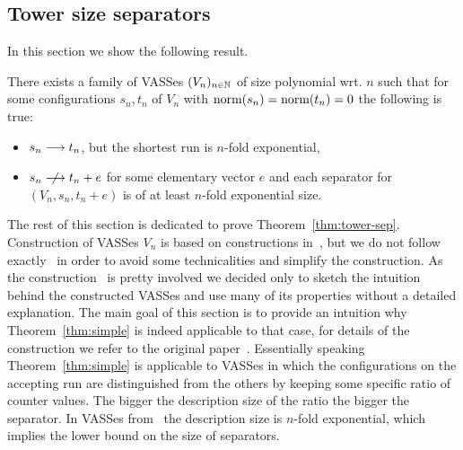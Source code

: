 \subsection{Tower size separators}\label{ssec:tower}
In this section we show the following result.

\begin{theorem}\label{thm:tower-sep}
There exists a family of VASSes $(V_n)_{n \in \mathbb{N}}$ of size polynomial wrt. $n$
such that for some configurations $s_n, t_n$ of $V_n$ with $\textup{norm}(s_n) = \textup{norm}(t_n) = 0$ the following is true:
\begin{itemize}
  \item $s_n \longrightarrow t_n$, but the shortest run is $n$-fold exponential,
  \item $s_n \nreaches t_n + e$ for some elementary vector $e$ and each separator
  for $(V_n, s_n, t_n + e)$ is of at least $n$-fold exponential size.
\end{itemize}
\end{theorem}

The rest of this section is dedicated to prove Theorem~\ref{thm:tower-sep}.
Construction of VASSes $V_n$ is based on constructions in~\cite{DBLP:conf/stoc/CzerwinskiLLLM19},
but we do not follow exactly~\cite{DBLP:conf/stoc/CzerwinskiLLLM19} in order to avoid
some technicalities and simplify the construction.
As the construction~\cite{DBLP:conf/stoc/CzerwinskiLLLM19} is pretty involved we decided
only to sketch the intuition behind the constructed VASSes and use many of its properties
without a detailed explanation. The main goal of this section is to provide an intuition why Theorem~\ref{thm:simple}
is indeed applicable to that case, for details of the construction we refer to the original paper~\cite{DBLP:conf/stoc/CzerwinskiLLLM19}.
Essentially speaking Theorem~\ref{thm:simple} is applicable to VASSes in which the configurations on the accepting run
are distinguished from the others by keeping some specific ratio of counter values. The bigger the description
size of the ratio the bigger the separator. In VASSes from~\cite{DBLP:conf/stoc/CzerwinskiLLLM19} the description size
is $n$-fold exponential, which implies the lower bound on the size of separators.

